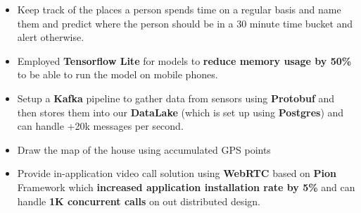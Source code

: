 \vspace{0.5cm}

\begin{itemize}
      \item Keep track of the places a person spends time on a regular basis and name them and predict where the person should be in a 30 minute time bucket and alert otherwise.
      \item Employed \textbf{Tensorflow Lite} for models to \textbf{reduce memory usage by 50\%} to be able to run the model on mobile phones.
      \item Setup a \textbf{Kafka} pipeline to gather data from sensors using \textbf{Protobuf} and
            then stores them into our \textbf{DataLake} (which is set up using \textbf{Postgres}) and can handle +20k messages per second.
      \item Draw the map of the house using accumulated GPS points
      \item Provide in-application video call solution using \textbf{WebRTC} based on \textbf{Pion} Framework which \textbf{increased application installation rate by 5\%} and can handle \textbf{1K concurrent calls} on out distributed design.
\end{itemize}
